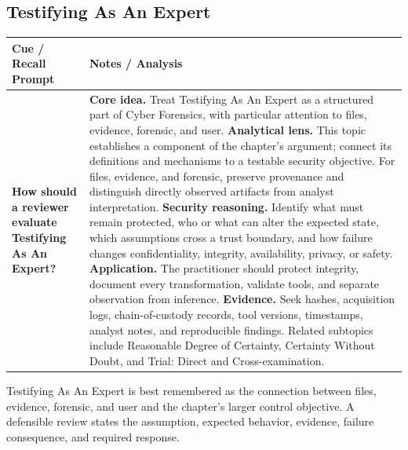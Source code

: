 \documentclass[11pt]{article}
\newcommand{\CornellHeader}{%
\rowcolor{Navy}\color{white}\bfseries Cue / Recall Prompt & \color{white}\bfseries Notes / Analysis\\\hline}
\newcommand{\CornellRow}[2]{%
\cellcolor{CueGray}\RaggedRight\textbf{#1} & \RaggedRight #2\\\hline}
\begin{document}
\subsection*{Testifying As An Expert}
\begin{longtable}{>{\RaggedRight\arraybackslash}p{}|>{\RaggedRight\arraybackslash}p{}}
\CornellHeader
\CornellRow{How should a reviewer evaluate Testifying As An Expert?}{\textbf{Core idea.} Treat Testifying As An Expert as a structured part of Cyber Forensics, with particular attention to files, evidence, forensic, and user. \textbf{Analytical lens.} This topic establishes a component of the chapter's argument; connect its definitions and mechanisms to a testable security objective. For files, evidence, and forensic, preserve provenance and distinguish directly observed artifacts from analyst interpretation. \textbf{Security reasoning.} Identify what must remain protected, who or what can alter the expected state, which assumptions cross a trust boundary, and how failure changes confidentiality, integrity, availability, privacy, or safety. \textbf{Application.} The practitioner should protect integrity, document every transformation, validate tools, and separate observation from inference. \textbf{Evidence.} Seek hashes, acquisition logs, chain-of-custody records, tool versions, timestamps, analyst notes, and reproducible findings. Related subtopics include Reasonable Degree of Certainty, Certainty Without Doubt, and Trial: Direct and Cross-examination.}
\end{longtable}
\begin{topicsummary}
Testifying As An Expert is best remembered as the connection between files, evidence, forensic, and user and the chapter's larger control objective. A defensible review states the assumption, expected behavior, evidence, failure consequence, and required response.
\end{topicsummary}
\end{document}
